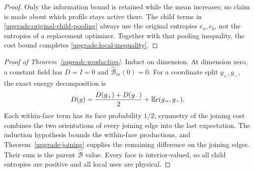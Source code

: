 \begin{proof}
Only the information bound is retained while the mean increases;
no claim is made about which profile stays active there. The child
terms in \eqref{upgrade:original-child-pooling} always use the
original entropies $e_a,e_b$, not the entropies of a replacement
optimizer. Together with that pooling inequality, the cost bound
completes \eqref{upgrade:local-inequality}.
\end{proof}

\begin{proof}[Proof of Theorem~\ref{upgrade:production}]
Induct on dimension. At dimension zero, a constant field has
$D=I=0$ and $\widehat{\mathcal B}_m(0)=0$. For a coordinate
split $g_+,g_-$, the exact energy decomposition is
\[
 D(g)=\frac{D(g_+)+D(g_-)}2+\mathbb E c(g_+,g_-).
\]
Each within-face term has its face probability $1/2$; symmetry
of the joining cost combines the two orientations of every
joining edge into the last expectation.
The induction hypothesis bounds the within-face productions,
and Theorem~\ref{upgrade:joining} supplies the remaining
difference on the joining edges. Their sum is the parent
$\widehat{\mathcal B}$ value. Every face is interior-valued,
so all child entropies are positive and all local uses are physical.
\end{proof}
